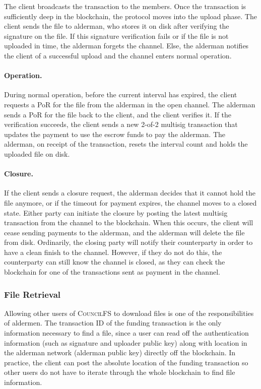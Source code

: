 \documentclass{article}
\begin{document}
The client broadcasts the transaction to the members. Once the transaction is
sufficiently deep in the blockchain, the protocol moves into the upload phase.
The client sends the file to alderman, who stores it on disk after verifying
the signature on the file. If this signature verification fails or if the file
is not uploaded in time, the alderman forgets the channel. Else, the alderman
notifies the client of a successful upload and the channel enters normal operation.

\paragraph{Operation.} During normal operation, before the current interval has
expired, the client requests a PoR for the file from the alderman in the open
channel. The alderman sends a PoR for the file back to the client, and the
client verifies it. If the verification succeeds, the client sends a new 2-of-2
multisig transaction that updates the payment to use the escrow funds to pay the
alderman. The alderman, on receipt of the transaction, resets the interval count
and holds the uploaded file on disk.

\paragraph{Closure.} If the client sends a closure request, the alderman decides
that it cannot hold the file anymore, or if the timeout for payment expires, the
channel moves to a closed state. Either party can initiate the closure by
posting the latest multisig transaction from the channel to the blockchain. When
this occurs, the client will cease sending payments to the alderman, and the
alderman will delete the file from disk. Ordinarily, the closing party will
notify their counterparty in order to have a clean finish to the channel.
However, if they do not do this, the counterparty can still know the channel is
closed, as they can check the blockchain for one of the transactions sent as
payment in the channel.

\subsubsection{File Retrieval}

Allowing other users of \textsc{CouncilFS} to download files is one of the
responsibilities of aldermen. The transaction ID of the funding transaction is
the only information necessary to find a file, since a user can read off the
authentication information (such as signature and uploader public key) along
with location in the alderman network (alderman public key) directly off the
blockchain. In practice, the client can post the absolute location of the
funding transaction so other users do not have to iterate through the whole
blockchain to find file information.
\end{document}

